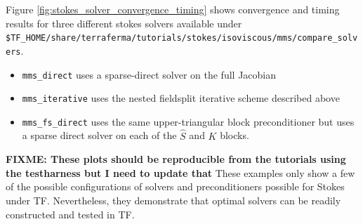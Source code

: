 Figure \ref{fig:stokes_solver_convergence_timing}  shows convergence
and timing results for three different stokes solvers available under
\texttt{\$TF\_HOME/share/terraferma/tutorials/stokes/isoviscous/mms/compare\_solvers}.
\begin{itemize}
\item \texttt{mms\_direct} uses a sparse-direct solver on the full Jacobian
\item \texttt{mms\_iterative} uses the nested fieldsplit iterative
  scheme described above
\item \texttt{mms\_fs\_direct} uses the same upper-triangular block
  preconditioner but uses a sparse direct solver on each of the
  $\hat{S}$ and $K$ blocks.
\end{itemize}
\textbf{FIXME:  These plots should be reproducible from the tutorials
  using the testharness but I need to update that}
These examples only show a few of the possible configurations of
solvers and preconditioners possible for Stokes under
TF. Nevertheless,  they demonstrate that optimal solvers can be
readily constructed and tested in TF.  


